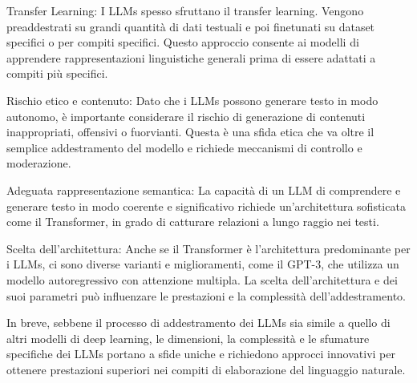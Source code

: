 Transfer Learning: I LLMs spesso sfruttano il transfer learning. Vengono preaddestrati su grandi quantità di dati testuali e poi finetunati su dataset specifici o per compiti specifici. Questo approccio consente ai modelli di apprendere rappresentazioni linguistiche generali prima di essere adattati a compiti più specifici.

Rischio etico e contenuto: Dato che i LLMs possono generare testo in modo autonomo, è importante considerare il rischio di generazione di contenuti inappropriati, offensivi o fuorvianti. Questa è una sfida etica che va oltre il semplice addestramento del modello e richiede meccanismi di controllo e moderazione.

Adeguata rappresentazione semantica: La capacità di un LLM di comprendere e generare testo in modo coerente e significativo richiede un'architettura sofisticata come il Transformer, in grado di catturare relazioni a lungo raggio nei testi.

Scelta dell'architettura: Anche se il Transformer è l'architettura predominante per i LLMs, ci sono diverse varianti e miglioramenti, come il GPT-3, che utilizza un modello autoregressivo con attenzione multipla. La scelta dell'architettura e dei suoi parametri può influenzare le prestazioni e la complessità dell'addestramento.

In breve, sebbene il processo di addestramento dei LLMs sia simile a quello di altri modelli di deep learning, le dimensioni, la complessità e le sfumature specifiche dei LLMs portano a sfide uniche e richiedono approcci innovativi per ottenere prestazioni superiori nei compiti di elaborazione del linguaggio naturale.

